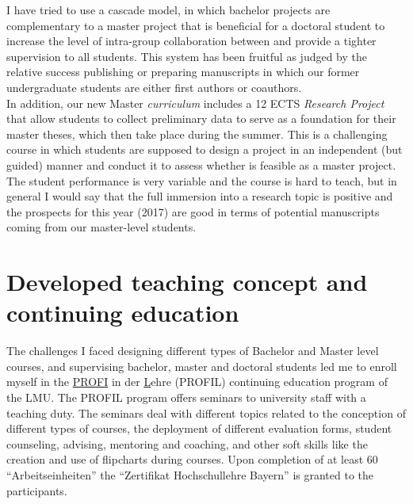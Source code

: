 \documentclass[a4paper,11pt]{article}
\begin{document}

I have tried to use a cascade model, in which bachelor projects are complementary to a master project that is beneficial for a doctoral student to increase the level of intra-group collaboration between and provide a tighter supervision to all students. This system has been fruitful as judged by the relative success publishing or preparing manuscripts in which our former undergraduate students are either first authors or coauthors.\\

In addition, our new Master \emph{curriculum} includes a 12 ECTS \emph{Research Project} that allow students to collect preliminary data to serve as a foundation for their master theses, which then take place during the summer. This is a challenging course in which students are supposed to design a project in an independent (but guided) manner and conduct it to assess whether is feasible as a master project. The student performance is very variable and the course is hard to teach, but in general I would say that the full immersion into a research topic is positive and the prospects for this year (2017) are good in terms of potential manuscripts coming from our master-level students.

\section*{Developed teaching concept and continuing education}

The challenges I faced designing different types of Bachelor and Master level courses, and supervising bachelor, master and doctoral students led me to enroll myself in the \underline{PROFI} in der \underline{L}ehre (PROFIL) continuing education program of the LMU. The PROFIL program offers seminars to university staff with a teaching duty. The seminars deal with different topics related to the conception of different types of courses, the deployment of different evaluation forms, student counseling, advising, mentoring and coaching, and other soft skills like the creation and use of flipcharts during courses. Upon completion of at least 60 ``Arbeitseinheiten'' the ``Zertifikat Hochschullehre Bayern'' is granted to the participants.
\end{document}
